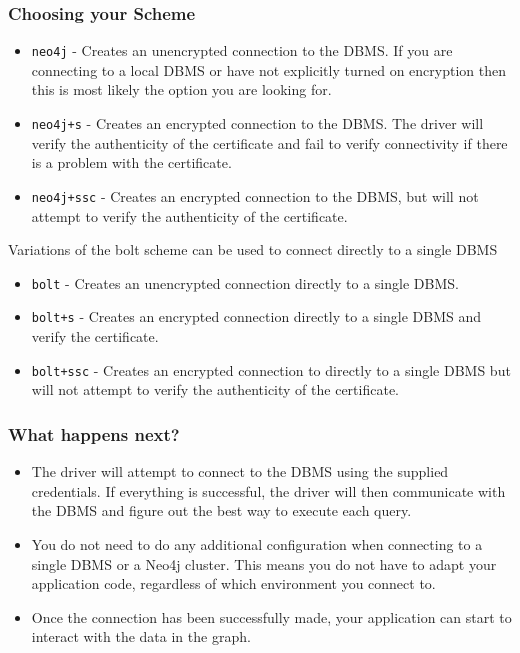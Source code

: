 \begin{frame}[fragile]\frametitle{Choosing your Scheme}
\begin{itemize}
\item \lstinline|neo4j| - Creates an unencrypted connection to the DBMS. If you are connecting to a local DBMS or have not explicitly turned on encryption then this is most likely the option you are looking for.
\item \lstinline|neo4j+s| - Creates an encrypted connection to the DBMS. The driver will verify the authenticity of the certificate and fail to verify connectivity if there is a problem with the certificate.
\item \lstinline|neo4j+ssc| - Creates an encrypted connection to the DBMS, but will not attempt to verify the authenticity of the certificate.
\end{itemize}

Variations of the bolt scheme can be used to connect directly to a single DBMS
\begin{itemize}
\item \lstinline|bolt| - Creates an unencrypted connection directly to a single DBMS.
\item \lstinline|bolt+s| - Creates an encrypted connection directly to a single DBMS and verify the certificate.
\item \lstinline|bolt+ssc| - Creates an encrypted connection to directly to a single DBMS but will not attempt to verify the authenticity of the certificate.
\end{itemize}
\end{frame}

\begin{frame}[fragile]\frametitle{What happens next?}
\begin{itemize}
\item The driver will attempt to connect to the DBMS using the supplied credentials. If everything is successful, the driver will then communicate with the DBMS and figure out the best way to execute each query.
\item You do not need to do any additional configuration when connecting to a single DBMS or a Neo4j cluster. This means you do not have to adapt your application code, regardless of which environment you connect to.
\item Once the connection has been successfully made, your application can start to interact with the data in the graph.
\end{itemize}

\end{frame}

